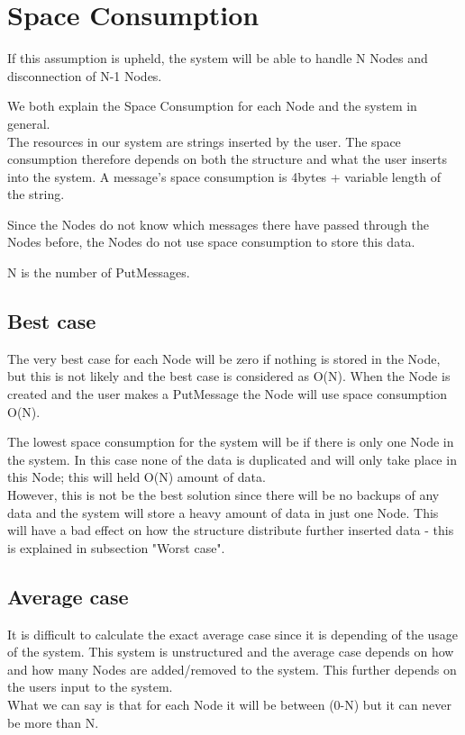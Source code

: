 \section{Space Consumption}
If this assumption is upheld, the system will be able to handle N Nodes and disconnection of N-1 Nodes.

We both explain the Space Consumption for each Node and the system in general.\\
The resources in our system are strings inserted by the user. The space consumption therefore depends on both the structure and what the user inserts into the system. A message's space consumption is 4bytes + variable length of the string. 

Since the Nodes do not know which messages there have passed through the Nodes before, the Nodes do not use space consumption to store this data. 



N is the number of PutMessages.

\subsection{Best case}
The very best case for each Node will be zero if nothing is stored in the Node, but this is not likely and the best case is considered as O(N). When the Node is created and the user makes a PutMessage the Node will use space consumption O(N).


The lowest space consumption for the system will be if there is only one Node in the system. In this case none of the data is duplicated and will only take place in this Node; this will held O(N) amount of data. \\ However, this is not be the best solution since there will be no backups of any data and the system will store a heavy amount of data in just one Node. This will have a bad effect on how the structure distribute further inserted data - this is explained in subsection "Worst case". \\ 

\subsection{Average case}
It is difficult to calculate the exact average case since it is depending of the usage of the system. This system is unstructured and the average case depends on how and how many Nodes are added/removed to the system. This further depends on the users input to the system.\\
What we can say is that for each Node it will be between (0-N) but it can never be more than N. \\

